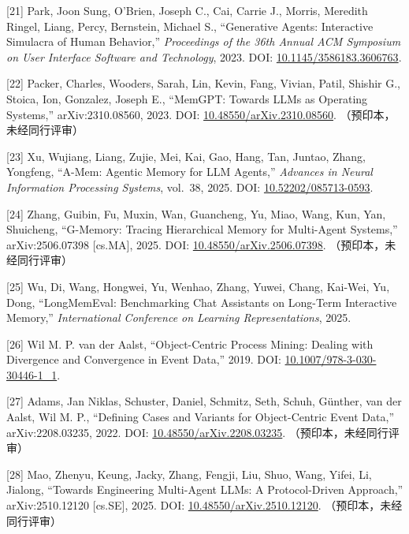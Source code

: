 \documentclass[
]{article}
\begin{document}
{[}21{]} Park, Joon Sung, O'Brien, Joseph C., Cai, Carrie J., Morris,
Meredith Ringel, Liang, Percy, Bernstein, Michael S., ``Generative
Agents: Interactive Simulacra of Human Behavior,'' \emph{Proceedings of
the 36th Annual ACM Symposium on User Interface Software and
Technology}, 2023. DOI:
\href{https://doi.org/10.1145/3586183.3606763}{10.1145/3586183.3606763}.

{[}22{]} Packer, Charles, Wooders, Sarah, Lin, Kevin, Fang, Vivian,
Patil, Shishir G., Stoica, Ion, Gonzalez, Joseph E., ``MemGPT: Towards
LLMs as Operating Systems,'' arXiv:2310.08560, 2023. DOI:
\href{https://doi.org/10.48550/arXiv.2310.08560}{10.48550/arXiv.2310.08560}.
（预印本，未经同行评审）

{[}23{]} Xu, Wujiang, Liang, Zujie, Mei, Kai, Gao, Hang, Tan, Juntao,
Zhang, Yongfeng, ``A-Mem: Agentic Memory for LLM Agents,''
\emph{Advances in Neural Information Processing Systems}, vol.~38, 2025.
DOI: \href{https://doi.org/10.52202/085713-0593}{10.52202/085713-0593}.

{[}24{]} Zhang, Guibin, Fu, Muxin, Wan, Guancheng, Yu, Miao, Wang, Kun,
Yan, Shuicheng, ``G-Memory: Tracing Hierarchical Memory for Multi-Agent
Systems,'' arXiv:2506.07398 {[}cs.MA{]}, 2025. DOI:
\href{https://doi.org/10.48550/arXiv.2506.07398}{10.48550/arXiv.2506.07398}.
（预印本，未经同行评审）

{[}25{]} Wu, Di, Wang, Hongwei, Yu, Wenhao, Zhang, Yuwei, Chang,
Kai-Wei, Yu, Dong, ``LongMemEval: Benchmarking Chat Assistants on
Long-Term Interactive Memory,'' \emph{International Conference on
Learning Representations}, 2025.

{[}26{]} Wil M. P. van der Aalst, ``Object-Centric Process Mining:
Dealing with Divergence and Convergence in Event Data,'' 2019. DOI:
\href{https://doi.org/10.1007/978-3-030-30446-1_1}{10.1007/978-3-030-30446-1\_1}.

{[}27{]} Adams, Jan Niklas, Schuster, Daniel, Schmitz, Seth, Schuh,
Günther, van der Aalst, Wil M. P., ``Defining Cases and Variants for
Object-Centric Event Data,'' arXiv:2208.03235, 2022. DOI:
\href{https://doi.org/10.48550/arXiv.2208.03235}{10.48550/arXiv.2208.03235}.
（预印本，未经同行评审）

{[}28{]} Mao, Zhenyu, Keung, Jacky, Zhang, Fengji, Liu, Shuo, Wang,
Yifei, Li, Jialong, ``Towards Engineering Multi-Agent LLMs: A
Protocol-Driven Approach,'' arXiv:2510.12120 {[}cs.SE{]}, 2025. DOI:
\href{https://doi.org/10.48550/arXiv.2510.12120}{10.48550/arXiv.2510.12120}.
（预印本，未经同行评审）
\end{document}
